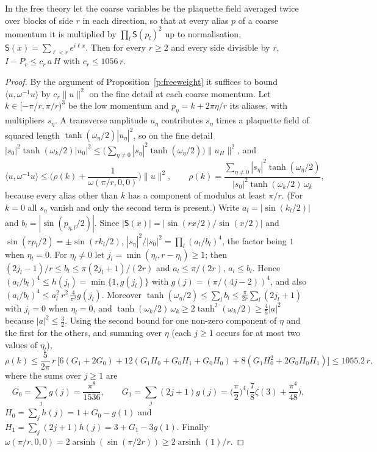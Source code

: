 \begin{proposition}\label{p:freeblock}
In the free theory let the coarse variables be the plaquette field averaged twice over blocks of side $r$ in
each direction, so that at every alias $p$ of a coarse momentum it is multiplied by
$\prod_l\mathsf S(p_l)^2$ up to normalisation, $\mathsf S(x)=\sum_{\ell<r}e^{i\ell x}$. Then for every
$r\ge2$ and every side divisible by $r$, $I-P_r\le c_r\,a\,H$ with $c_r\le1056\,r$.
\end{proposition}
\begin{proof}
By the argument of Proposition~\ref{p:freeweight} it suffices to bound $\langle u,\omega^{-1}u\rangle$ by
$c_r\|u\|^2$ on the fine detail at each coarse momentum. Let $k\in[-\pi/r,\pi/r)^3$ be the low momentum and
$p_\eta=k+2\pi\eta/r$ its aliases, with multipliers $s_\eta$. A transverse amplitude $u_\eta$ contributes
$s_\eta$ times a plaquette field of squared length $\tanh(\omega_\eta/2)|u_\eta|^2$, so on the fine detail
$|s_0|^2\tanh(\omega_k/2)|u_0|^2\le\big(\sum_{\eta\ne0}|s_\eta|^2\tanh(\omega_\eta/2)\big)\|u_H\|^2$, and
\[
\langle u,\omega^{-1}u\rangle\le\Big(\rho(k)+\frac1{\omega(\pi/r,0,0)}\Big)\|u\|^2,\qquad
\rho(k)=\frac{\sum_{\eta\ne0}|s_\eta|^2\tanh(\omega_\eta/2)}{|s_0|^2\tanh(\omega_k/2)\,\omega_k},
\]
because every alias other than $k$ has a component of modulus at least $\pi/r$. (For $k=0$ all
$s_\eta$ vanish and only the second term is present.) Write $a_l=|\sin(k_l/2)|$ and
$b_l=|\sin(p_{\eta,l}/2)|$. Since $|\mathsf S(x)|=|\sin(rx/2)/\sin(x/2)|$ and $\sin(rp_l/2)=\pm\sin(rk_l/2)$,
$|s_\eta|^2/|s_0|^2=\prod_l(a_l/b_l)^4$, the factor being $1$ when $\eta_l=0$. For $\eta_l\ne0$ let
$j_l=\min(\eta_l,r-\eta_l)\ge1$; then $(2j_l-1)/r\le b_l\le\pi(2j_l+1)/(2r)$ and $a_l\le\pi/(2r)$,
$a_l\le b_l$. Hence $(a_l/b_l)^4\le h(j_l)=\min\{1,g(j_l)\}$ with $g(j)=(\pi/(4j-2))^4$, and also
$(a_l/b_l)^4\le a_l^2\,r^2\,\tfrac4{\pi^2}g(j_l)$. Moreover
$\tanh(\omega_\eta/2)\le\sum_lb_l\le\tfrac\pi{2r}\sum_l(2j_l+1)$ with $j_l=0$ when $\eta_l=0$, and
$\tanh(\omega_k/2)\,\omega_k\ge2\tanh^2(\omega_k/2)\ge\tfrac45|a|^2$ because $|a|^2\le\tfrac32$. Using the
second bound for one non-zero component of $\eta$ and the first for the others, and summing over $\eta$ (each
$j\ge1$ occurs for at most two values of $\eta_l$),
\[
\rho(k)\le\frac5{2\pi}\,r\,\Big[6(G_1+2G_0)+12(G_1H_0+G_0H_1+G_0H_0)+8(G_1H_0^2+2G_0H_0H_1)\Big]\le1055.2\,r,
\]
where the sums over $j\ge1$ are
\[
G_0=\sum_jg(j)=\frac{\pi^8}{1536},\qquad
G_1=\sum_j(2j+1)g(j)=\Big(\frac\pi2\Big)^4\Big(\frac78\zeta(3)+\frac{\pi^4}{48}\Big),
\]
$H_0=\sum_jh(j)=1+G_0-g(1)$ and $H_1=\sum_j(2j+1)h(j)=3+G_1-3g(1)$. Finally
$\omega(\pi/r,0,0)=2\operatorname{arsinh}(\sin(\pi/2r))\ge2\operatorname{arsinh}(1)/r$.
\end{proof}

